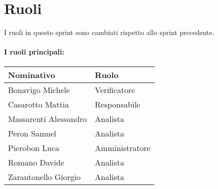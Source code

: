 \section{Ruoli}

I ruoli in questo sprint sono cambiati rispetto allo sprint precedente.

\paragraph{I ruoli principali:}

\begin{center}
    \begin{tabularx}{\textwidth}{X l}
        
        \rowcolor{gray!30} \textbf{Nominativo} & \textbf{Ruolo}\\
        
        \hline

        Bonavigo Michele & Verificatore \\
        \rowcolor{gray!10}Casarotto Mattia & Responsabile \\
        Massarenti Alessandro & Analista \\
        \rowcolor{gray!10}Peron Samuel & Analista \\
        Pierobon Luca & Amministratore \\
        \rowcolor{gray!10}Romano Davide & Analista \\
        Zarantonello Giorgio & Analista \\

    \end{tabularx}
\end{center}
